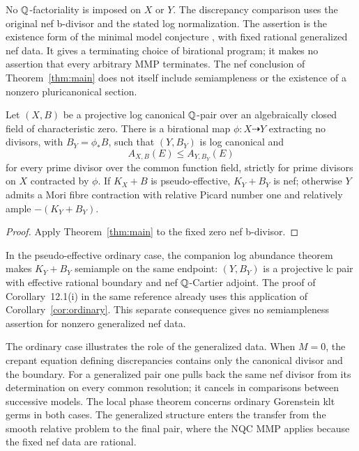 No $\mathbb Q$-factoriality is imposed on $X$ or $Y$. The discrepancy comparison
uses the original nef b-divisor and the stated log normalization.
The assertion is the existence form of the minimal model conjecture
\cite[Conjecture~1.1]{GongyoMinimalModel}, with fixed rational generalized
nef data. It gives a terminating choice of birational program; it makes
no assertion that every arbitrary MMP terminates. The nef conclusion of
Theorem~\ref{thm:main} does not itself include semiampleness or the
existence of a nonzero pluricanonical section.

\begin{corollary}\label{cor:ordinary}
Let $(X,B)$ be a projective log canonical $\mathbb Q$-pair over an algebraically
closed field of characteristic zero. There is a birational map
$\phi:X\dashrightarrow Y$ extracting no divisors, with $B_Y=\phi_*B$,
such that $(Y,B_Y)$ is log canonical and
\[
 A_{X,B}(E)\leq A_{Y,B_Y}(E)
\]
for every prime divisor over the common function field, strictly for
prime divisors on $X$ contracted by $\phi$. If $K_X+B$ is
pseudo-effective, $K_Y+B_Y$ is nef; otherwise $Y$ admits a Mori fibre
contraction with relative Picard number one and relatively ample
$-(K_Y+B_Y)$.
\end{corollary}
\begin{proof}
Apply Theorem~\ref{thm:main} to the fixed zero nef b-divisor.
\end{proof}

In the pseudo-effective ordinary case, the companion log abundance theorem
\cite[Theorem~1.1]{OpenAILogAbundance2026} makes $K_Y+B_Y$ semiample on
the same endpoint: $(Y,B_Y)$ is a projective lc pair with effective rational
boundary and nef $\mathbb Q$-Cartier adjoint. The proof of Corollary~12.1(i) in the same
reference already uses this application of Corollary~\ref{cor:ordinary}.
This separate consequence gives no semiampleness assertion for nonzero
generalized nef data.

The ordinary case illustrates the role of the generalized data. When
$M=0$, the crepant equation defining discrepancies contains only the
canonical divisor and the boundary. For a generalized pair one pulls
back the same nef divisor from its determination on every common
resolution; it cancels in comparisons between successive models.
The local phase theorem concerns ordinary Gorenstein klt germs in both
cases. The generalized structure enters the transfer from the smooth
relative problem to the final pair, where the NQC MMP applies because
the fixed nef data are rational.

